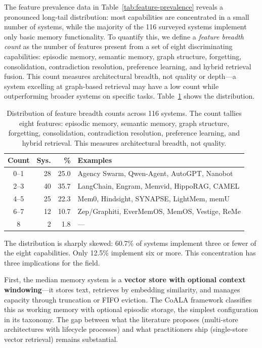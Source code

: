 The feature prevalence data in Table~\ref{tab:feature-prevalence} reveals a
pronounced long-tail distribution: most capabilities are concentrated in a
small number of systems, while the majority of the 116 surveyed systems
implement only basic memory functionality. To quantify this, we define a
\emph{feature breadth count} as the number of features present from a set of
eight discriminating capabilities: episodic memory, semantic memory, graph
structure, forgetting, consolidation, contradiction resolution, preference
learning, and hybrid retrieval fusion.  This count measures architectural
breadth, not quality or depth---a system excelling at graph-based retrieval
may have a low count while outperforming broader systems on specific tasks.
Table~\ref{tab:capability-distribution} shows the distribution.

\begin{table}[!t]
\centering
\caption{Distribution of feature breadth counts across 116 systems.  The count tallies eight features: episodic memory, semantic memory, graph structure, forgetting, consolidation, contradiction resolution, preference learning, and hybrid retrieval.  This measures architectural breadth, not quality.}
\label{tab:capability-distribution}
\small
\begin{tabular}{@{}crrp{3.8cm}@{}}
\toprule
\textbf{Count} & \textbf{Sys.} & \textbf{\%} & \textbf{Examples} \\
\midrule
0--1 & 28 & 25.0 & Agency Swarm, Qwen-Agent, AutoGPT, Nanobot \\
2--3 & 40 & 35.7 & LangChain, Engram, Memvid, HippoRAG, CAMEL \\
4--5 & 25 & 22.3 & Mem0, Hindsight, SYNAPSE, LightMem, memU \\
6--7 & 12 & 10.7 & Zep/Graphiti, EverMemOS, MemOS, Vestige, ReMe \\
8    &  2 &  1.8 & --- \\
\bottomrule
\end{tabular}
\end{table}

The distribution is sharply skewed: 60.7\% of systems implement three or
fewer of the eight capabilities. Only 12.5\% implement six or more. This concentration has three implications for the
field.

First, the median memory system is a \textbf{vector store with optional
context windowing}---it stores text, retrieves by embedding similarity, and
manages capacity through truncation or FIFO eviction. The CoALA framework
\cite{sumers2024coala} classifies this as working memory with optional
episodic storage, the simplest configuration in its taxonomy. The gap between
what the literature proposes (multi-store architectures with lifecycle
processes) and what practitioners ship (single-store vector retrieval) remains
substantial.

